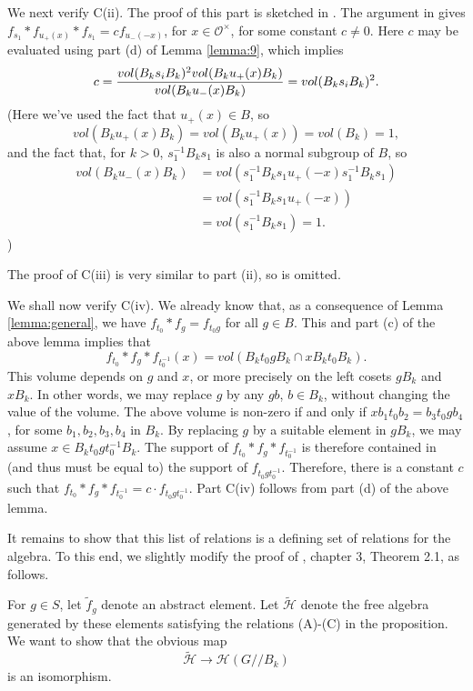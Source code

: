 \documentclass[12pt,letterpaper]{amsart}
\theoremstyle{definition}
\theoremstyle{remark}
\begin{document}
We next verify C(ii). The proof of this part is sketched
in \cite{H}. The argument in \cite{H} gives
$f_{s_1}*f_{u_+(x)}*f_{s_1}=cf_{u_-(-x)}$, for
$x\in \mathcal{O}^\times$, for some constant $c\not= 0$.
Here $c$ may be evaluated using
part (d) of Lemma \ref{lemma:9}, which implies
\[
c={ vol(B_k s_i B_k)^2vol(B_k u_+(x) B_k)\over 
vol(B_k u_-(x) B_k)}=vol(B_k s_i B_k)^2.
\]
(Here we've used the fact that $u_+(x)\in B$, so
\[
vol(B_k u_+(x) B_k)=vol(B_k u_+(x))=vol(B_k)=1,
\]
and the fact that, for $k>0$, $s_1^{-1}B_ks_1$ is also a
normal subgroup of $B$, so
\[
\begin{aligned}
vol(B_k u_-(x) B_k)
&=vol(s_1^{-1}B_ks_1 u_+(-x) s_1^{-1}B_ks_1)\\
&=vol(s_1^{-1}B_ks_1 u_+(-x))\\
&=vol(s_1^{-1}B_ks_1)=1.
\end{aligned}
\]
)

The proof of C(iii) is very similar to part (ii), so
is omitted.

We shall now verify C(iv). We already know that, as a consequence of 
Lemma \ref{lemma:general}, we have $f_{t_0}*f_g=f_{t_0g}$
for all $g\in B$. This and part (c) of the above lemma implies that
\[
f_{t_0}*f_g*f_{t_0^{-1}}(x)=vol(B_kt_0gB_k\cap xB_kt_0B_k).
\]
This volume depends on $g$ and $x$, or more precisely on the
left cosets $gB_k$ and $xB_k$. In other words, we may
replace $g$ by any $gb$, $b\in B_k$, without changing the value
of the volume. The above volume is non-zero if and only if
$xb_1t_0b_2=b_3t_0gb_4$, for some $b_1,b_2,b_3,b_4$ in $B_k$.
By replacing $g$ by a suitable element in $gB_k$, we may assume
$x\in B_kt_0gt_0^{-1}B_k$. The support of $f_{t_0}*f_g*f_{t_0^{-1}}$
is therefore contained in (and thus must be equal to)
the support of $f_{t_0gt_0^{-1}}$. Therefore, there is a constant $c$
such that $f_{t_0}*f_g*f_{t_0^{-1}}=c\cdot f_{t_0gt_0^{-1}}$.
Part C(iv) follows from part (d) of the above lemma.

It remains to show that this list of relations is a 
defining set of relations for the algebra. To this end, 
we slightly modify the proof of \cite{H}, chapter 3, Theorem 2.1,
as follows.

For $g\in S$, let $\tilde{f}_g$ denote an abstract element.
Let $\tilde{\mathcal{H}}$ denote the free algebra generated by these 
elements satisfying the relations (A)-(C) in the 
proposition. We want to show that the obvious map
\begin{equation}
\tilde{\mathcal{H}}\rightarrow \mathcal{H}(G//B_k)
\label{eq:obvious}
\end{equation}
is an isomorphism. 
\end{document}
